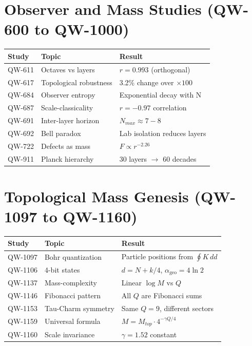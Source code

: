 \documentclass[11pt, a4paper]{article}
\theoremstyle{remark}
\newcommand{\alphageo}{\alpha_{\text{geo}}}
\begin{document}
\section{Observer and Mass Studies (QW-600 to QW-1000)}

\begin{center}
\begin{longtable}{|l|l|l|}
\hline
\textbf{Study} & \textbf{Topic} & \textbf{Result} \\
\hline
QW-611 & Octaves vs layers & $r = 0.993$ (orthogonal) \\
QW-617 & Topological robustness & 3.2\% change over $\times 100$ \\
QW-684 & Observer entropy & Exponential decay with N \\
QW-687 & Scale-classicality & $r = -0.97$ correlation \\
QW-691 & Inter-layer horizon & $N_{max} \approx 7-8$ \\
QW-692 & Bell paradox & Lab isolation reduces layers \\
QW-722 & Defects as mass & $F \propto r^{-2.26}$ \\
QW-911 & Planck hierarchy & 30 layers $\to$ 60 decades \\
\hline
\end{longtable}
\end{center}

\section{Topological Mass Genesis (QW-1097 to QW-1160)}

\begin{center}
\begin{longtable}{|l|l|l|}
\hline
\textbf{Study} & \textbf{Topic} & \textbf{Result} \\
\hline
QW-1097 & Bohr quantization & Particle positions from $\oint K \, dd$ \\
QW-1106 & 4-bit states & $d = N + k/4$, $\alphageo = 4\ln 2$ \\
QW-1137 & Mass-complexity & Linear $\log M$ vs $Q$ \\
QW-1146 & Fibonacci pattern & All $Q$ are Fibonacci sums \\
QW-1153 & Tau-Charm symmetry & Same $Q=9$, different sectors \\
QW-1159 & Universal formula & $M = M_{top} \cdot 4^{-\gamma Q/4}$ \\
QW-1160 & Scale invariance & $\gamma = 1.52$ constant \\
\hline
\end{longtable}
\end{center}
\end{document}
